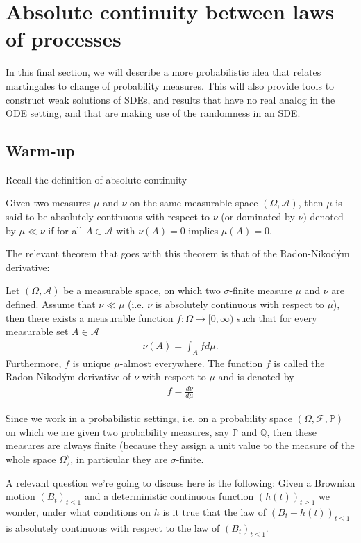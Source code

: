 \documentclass[../mainfile.tex]{subfiles}
\begin{document}
\section{Absolute continuity between laws of processes}
In this final section, we will describe a more probabilistic idea that relates martingales to change of probability measures. This will also provide tools to construct weak solutions of SDEs, and results that have no real analog in the ODE setting, and that are making use of the randomness in an SDE.
\subsection{Warm-up}
Recall the definition of absolute continuity 
\begin{defn} Given two measures $\mu$ and $\nu$ on the same measurable space $(\Omega, \mathcal{A})$, then $\mu$ is said to be absolutely continuous with respect to $\nu$ (or dominated by $\nu)$ denoted by $\mu \ll \nu$ if for all $A \in \mathcal{A}$ with $\nu (A)=0$ implies $\mu(A)=0$. 
\end{defn}
The relevant theorem that goes with this theorem is that of the Radon-Nikodým derivative:
\begin{thm} Let $(\Omega, \mathcal{A})$ be a measurable space, on which two $\sigma$-finite measure $\mu$ and $\nu$ are defined. Assume that $\nu \ll \mu$ (i.e. $\nu$ is absolutely continuous with respect to $\mu$), then there exists a measurable function $f: \Omega \to [0, \infty)$ such that for every measurable set $A \in \mathcal{A}$ 
\begin{align*}
\nu (A) = \int_A f d \mu. 
\end{align*}
Furthermore, $f$ is unique $\mu$-almost everywhere. The function $f$ is called the Radon-Nikodým derivative of $\nu$ with respect to $\mu$ and is denoted by 
\begin{align*}
f = \frac{d \nu}{d \mu}
\end{align*}
\end{thm}
\begin{rem} Since we work in a probabilistic settings, i.e. on a probability space $(\Omega, \mathcal{F}, \mathbb{P})$ on which we are given two probability measures, say $\mathbb{P}$ and $\mathbb{Q}$, then these measures are always finite (because they assign a unit value to the measure of the whole space $\Omega$), in particular they are $\sigma$-finite. 
\end{rem}
A relevant question we're going to discuss here is the following: Given a Brownian motion $(B_t)_{t \leq 1}$ and a deterministic continuous function $(h(t))_{t \geq 1}$ we wonder, under what conditions on $h$ is it true that the law of $(B_t + h(t))_{t \leq 1}$ is absolutely continuous with respect to the law of $(B_t)_{t \leq 1}$. 
\newpage
\end{document}
